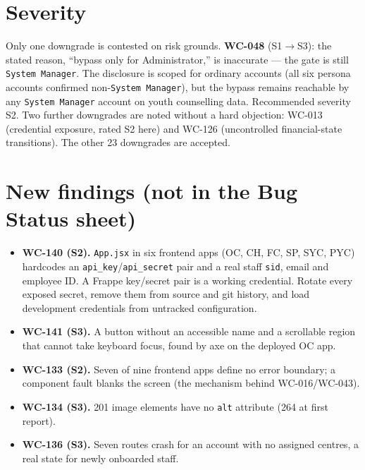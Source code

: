 \documentclass[11pt]{article}
\newcommand{\wc}[1]{\mbox{WC-#1}}
\begin{document}
\section{Severity}
Only one downgrade is contested on risk grounds. \textbf{\wc{048}} (S1$\rightarrow$S3): the stated
reason, ``bypass only for Administrator,'' is inaccurate --- the gate is still \texttt{System Manager}.
The disclosure is scoped for ordinary accounts (all six persona accounts confirmed non-\texttt{System
Manager}), but the bypass remains reachable by any \texttt{System Manager} account on youth counselling
data. Recommended severity S2. Two further downgrades are noted without a hard objection: \wc{013}
(credential exposure, rated S2 here) and \wc{126} (uncontrolled financial-state transitions). The other
23 downgrades are accepted.

\section{New findings (not in the Bug Status sheet)}
\begin{itemize}
  \item \textbf{\wc{140} (S2).} \texttt{App.jsx} in six frontend apps (OC, CH, FC, SP, SYC, PYC) hardcodes
        an \texttt{api\_key}/\texttt{api\_secret} pair and a real staff \texttt{sid}, email and employee
        ID. A Frappe key/secret pair is a working credential. Rotate every exposed secret, remove them
        from source and git history, and load development credentials from untracked configuration.
  \item \textbf{\wc{141} (S3).} A button without an accessible name and a scrollable region that cannot
        take keyboard focus, found by axe on the deployed OC app.
  \item \textbf{\wc{133} (S2).} Seven of nine frontend apps define no error boundary; a component fault
        blanks the screen (the mechanism behind \wc{016}/\wc{043}).
  \item \textbf{\wc{134} (S3).} 201 image elements have no \texttt{alt} attribute (264 at first report).
  \item \textbf{\wc{136} (S3).} Seven routes crash for an account with no assigned centres, a real state
        for newly onboarded staff.
\end{itemize}
\end{document}
